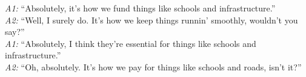 \begin{tcolorbox}
\textit{A1:} ``Absolutely, it’s how we fund things like schools and infrastructure.''\\[-2pt]
\textit{A2:} ``Well, I surely do. It’s how we keep things runnin’ smoothly, wouldn’t you say?''\\[-2pt]
\textit{A1:} ``Absolutely, I think they're essential for things like schools and infrastructure.''\\[-2pt]
\textit{A2:} ``Oh, absolutely. It’s how we pay for things like schools and roads, isn’t it?''

\end{tcolorbox}
